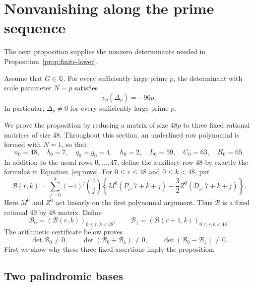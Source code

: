 \section{Nonvanishing along the prime sequence}
\label{sec:nonvanishing}

The next proposition supplies the nonzero determinants needed in
Proposition~\ref{prop:finite-lower}.

\begin{proposition}\label{prop:nonvanishing}
Assume that $G\in\mathbb Q$. For every sufficiently large prime $p$, the
determinant with scale parameter $N=p$ satisfies
\begin{equation}\label{eq:nonvanishing-exact-valuation}
 v_p(\Delta_p)=-96p.
\end{equation}
In particular, $\Delta_p\ne0$ for every sufficiently large prime $p$.
\end{proposition}

We prove the proposition by reducing a matrix of size $48p$ to three fixed
rational matrices of size $48$. Throughout this section, an underlined row
polynomial is formed with $N=1$, so that
\[
 n_0=48,\quad b_0=7,\quad q_0=g_0=4,\quad h_0=2,\quad
 L_0=59,\quad C_0=63,\quad H_0=65.
\]
In addition to the usual rows $0,\ldots,47$, define the auxiliary row $48$
by exactly the formulas in Equation~\eqref{eq:rows}. For $0\le r\le48$ and
$0\le k<48$, put
\begin{equation}\label{eq:nonvanishing-base-matrix}
 \mathcal B(r,k)=\sum_{j=0}^{4}(-1)^j\binom4j
 \left\{M^0(\underline P_r,7+k+j)
              -\frac32 Z^0(\underline D_r,7+k+j)\right\}.
\end{equation}
Here $M^0$ and $Z^0$ act linearly on the first polynomial argument. Thus
$\mathcal B$ is a fixed rational $49$ by $48$ matrix. Define
\[
 \mathcal B_0=(\mathcal B(r,k))_{0\le r,k<48},\qquad
 \mathcal B_1=(\mathcal B(r+1,k))_{0\le r,k<48}.
\]
The arithmetic certificate below proves
\begin{equation}\label{eq:nonvanishing-fixed-determinants}
 \det\mathcal B_0\ne0,\qquad
 \det(\mathcal B_0+\mathcal B_1)\ne0,\qquad
 \det(\mathcal B_0-\mathcal B_1)\ne0.
\end{equation}
First we show why these three fixed assertions imply the proposition.

\subsection{Two palindromic bases}

